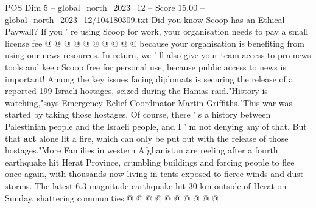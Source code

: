 \begin{textsample}{POS Dim 5 – global\_north\_2023\_12 – Score 15.00 – global\_north\_2023\_12/104180309.txt}
Did you know Scoop has an Ethical Paywall?
If you ' re using Scoop for work, your organisation needs to pay a small license fee @ @ @ @ @ @ @ @ @ @ because your organisation is benefiting from using our news resources.
In return, we ' ll also give your team access to pro news tools and keep Scoop free for personal use, because public access to news is important!
Among the key issues facing diplomats is securing the release of a reported 199 Israeli hostages, seized during the Hamas raid."History is watching,"says Emergency Relief Coordinator Martin Griffiths."This war was started by taking those hostages.
Of course, there ' s a history between Palestinian people and the Israeli people, and I ' m not denying any of that.
But that \textbf{act} alone lit a fire, which can only be put out with the release of those hostages."More Families in western Afghanistan are reeling after a fourth earthquake hit Herat Province, crumbling buildings and forcing people to flee once again, with thousands now living in tents exposed to fierce winds and dust storms.
The latest 6.3 magnitude earthquake hit 30 km outside of Herat on Sunday, shattering communities @ @ @ @ @ @ @ @ @ @

\end{textsample}
